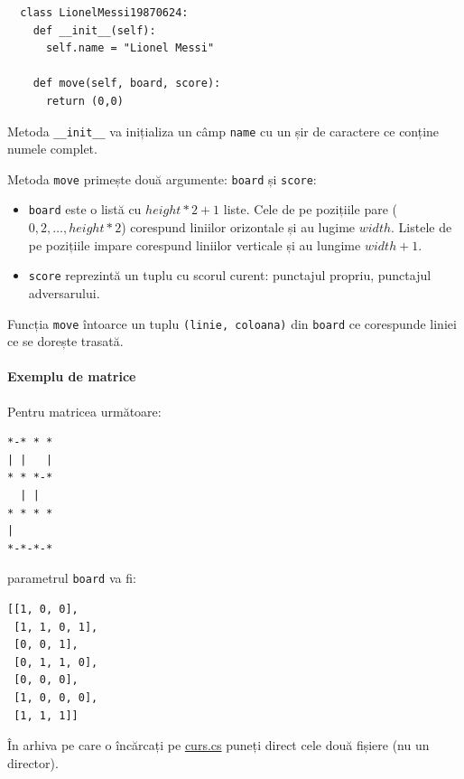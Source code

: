 \documentclass[12pt]{article}
\begin{document}
\begin{verbatim}
  class LionelMessi19870624:
    def __init__(self):
      self.name = "Lionel Messi"

    def move(self, board, score):
      return (0,0)
\end{verbatim}

Metoda \texttt{\_\_init\_\_} va inițializa un câmp \texttt{name} cu un șir
de caractere ce conține numele complet.

Metoda \texttt{move} primește două argumente: \texttt{board} și \texttt{score}:
\begin{itemize}
\item \texttt{board} este o listă cu $height * 2 + 1$ liste. Cele de
  pe pozițiile pare ($0, 2, \ldots, height * 2$) corespund liniilor
  orizontale și au lugime $width$. Listele de pe pozițiile impare
  corespund liniilor verticale și au lungime $width + 1$.
\item \texttt{score} reprezintă un tuplu cu scorul curent: punctajul
  propriu, punctajul adversarului.
\end{itemize}
Funcția \texttt{move} întoarce un tuplu \texttt{(linie, coloana)} din
\texttt{board} ce corespunde liniei ce se dorește trasată.

\paragraph{Exemplu de matrice}

Pentru matricea următoare:
\begin{verbatim}
*-* * *
| |   |
* * *-*
  | |  
* * * *
|      
*-*-*-*
\end{verbatim}
parametrul \texttt{board} va fi:
\begin{verbatim}
[[1, 0, 0],
 [1, 1, 0, 1],
 [0, 0, 1],
 [0, 1, 1, 0],
 [0, 0, 0],
 [1, 0, 0, 0],
 [1, 1, 1]]
\end{verbatim}

În arhiva pe care o încărcați pe \url{curs.cs} puneți direct cele două
fișiere (nu un director).
\end{document}

